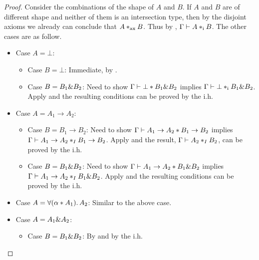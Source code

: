 \begin{proof}

  Consider the combinations of the shape of $A$ and $B$. If $A$ and $B$ are of
  different shape and neither of them is an intersection type, then by the
  disjoint axioms we already can conclude that $A *_\textnormal{ax} B$. Thus by
  , $\Gamma \vdash A *_\textnormal{i} B$. The other cases are as
  follow.

  \begin{itemize}
    \item Case $A = \bot$:
    \begin{itemize}
      \item Case $B = \bot$: Immediate, by .

      \item Case $B = B_1 \& B_2$: Need to show $\Gamma \vdash \bot * B_1
      \& B_2$ implies $\Gamma \vdash \bot *_\textnormal{i} B_1 \& B_2$. Apply
       and the resulting conditions can be proved by
      the i.h.
    \end{itemize}

    \item Case $A = A_1 \to A_2$:

    \begin{itemize}

      \item Case $B = B_1 \to B_2$:
      Need to show $\Gamma \vdash A_1 \to A_2 * B_1 \to B_2$ implies
      $\Gamma \vdash  A_1 \to A_2 *_I B_1 \to B_2$. Apply
       and the result, $\Gamma \vdash A_2 *_I B_2$,
      can be proved by the i.h.

      \item Case $B = B_1 \& B_2$: Need to show $\Gamma \vdash A_1 \to
      A_2 * B_1 \& B_2$ implies $\Gamma \vdash A_1 \to A_2 *_I B_1
      \& B_2$. Apply  and the resulting
      conditions can be proved by the i.h.

    \end{itemize}
    \item Case $A = \forall (\alpha * A_1).\, A_2$: Similar to the above case.


    \item Case $A = A_1 \& A_2$:

    \begin{itemize}
      \item Case $B = B_1 \& B_2$: By  and by the i.h.
    \end{itemize}

  \end{itemize}
\end{proof}
